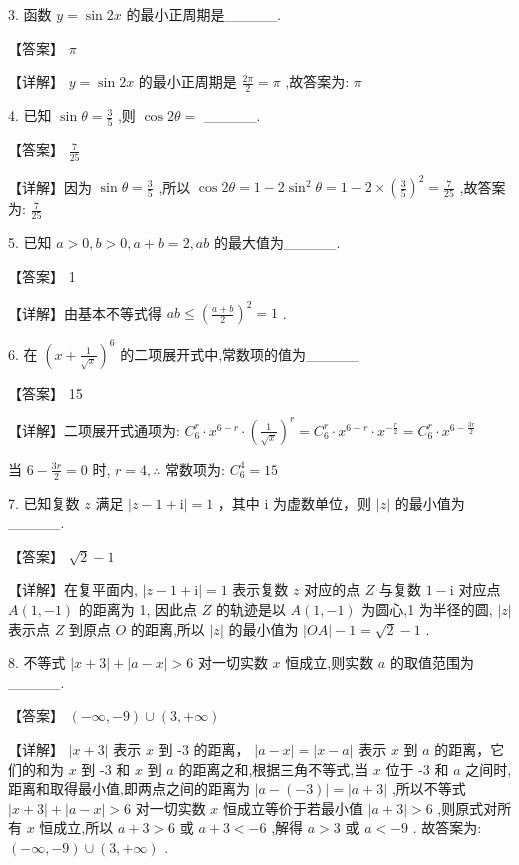 \documentclass[10pt]{article}
\begin{document}
3. 函数 \(y = \sin {2x}\) 的最小正周期是\_\_\_\_\_.

【答案】 \(\pi\)

【详解】 \(y = \sin {2x}\) 的最小正周期是 \(\frac{2\pi }{2} = \pi\) ,故答案为: \(\pi\)

4. 已知 \(\sin \theta  = \frac{3}{5}\) ,则 \(\cos {2\theta } =\) \_\_\_\_\_.

【答案】 \(\frac{7}{25}\)

【详解】因为 \(\sin \theta  = \frac{3}{5}\) ,所以 \(\cos {2\theta } = 1 - 2{\sin }^{2}\theta  = 1 - 2 \times  {\left( \frac{3}{5}\right) }^{2} = \frac{7}{25}\) ,故答案为: \(\frac{7}{25}\)

5. 已知 \(a > 0,b > 0,a + b = 2,{ab}\) 的最大值为\_\_\_\_\_.

【答案】 1

【详解】由基本不等式得 \({ab} \leq  {\left( \frac{a + b}{2}\right) }^{2} = 1\) .

6. 在 \({\left( x + \frac{1}{\sqrt{x}}\right) }^{6}\) 的二项展开式中,常数项的值为\_\_\_\_\_

【答案】 15

【详解】二项展开式通项为: \({C}_{6}^{r} \cdot  {x}^{6 - r} \cdot  {\left( \frac{1}{\sqrt{x}}\right) }^{r} = {C}_{6}^{r} \cdot  {x}^{6 - r} \cdot  {x}^{-\frac{r}{2}} = {C}_{6}^{r} \cdot  {x}^{6 - \frac{3r}{2}}\)

当 \(6 - \frac{3r}{2} = 0\) 时, \(r = 4,\therefore\) 常数项为: \({C}_{6}^{4} = {15}\)

7. 已知复数 \(z\) 满足 \(\left| {z - 1 + \mathrm{i}}\right|  = 1\) ，其中 \(\mathrm{i}\) 为虚数单位，则 \(\left| z\right|\) 的最小值为\_\_\_\_\_.

【答案】 \(\sqrt{2} - 1\)

【详解】在复平面内, \(\left| {z - 1 + \mathrm{i}}\right|  = 1\) 表示复数 \(z\) 对应的点 \(Z\) 与复数 \(1 - \mathrm{i}\) 对应点 \(A\left( {1, - 1}\right)\) 的距离为 1, 因此点 \(Z\) 的轨迹是以 \(A\left( {1, - 1}\right)\) 为圆心,1 为半径的圆, \(\left| z\right|\) 表示点 \(Z\) 到原点 \(O\) 的距离,所以 \(\left| z\right|\) 的最小值为 \(\left| {OA}\right|  - 1 = \sqrt{2} - 1\) .

8. 不等式 \(\left| {x + 3}\right|  + \left| {a - x}\right|  > 6\) 对一切实数 \(x\) 恒成立,则实数 \(a\) 的取值范围为\_\_\_\_\_.

【答案】 \(\left( {-\infty , - 9}\right)  \cup  \left( {3, + \infty }\right)\)

【详解】 \(\left| {x + 3}\right|\) 表示 \(x\) 到 -3 的距离， \(\left| {a - x}\right|  = \left| {x - a}\right|\) 表示 \(x\) 到 \(a\) 的距离，它们的和为 \(x\) 到 -3 和 \(x\) 到 \(a\) 的距离之和,根据三角不等式,当 \(x\) 位于 -3 和 \(a\) 之间时,距离和取得最小值,即两点之间的距离为 \(\left| {a - \left( {-3}\right) }\right|  = \left| {a + 3}\right|\) ,所以不等式 \(\left| {x + 3}\right|  + \left| {a - x}\right|  > 6\) 对一切实数 \(x\) 恒成立等价于若最小值 \(\left| {a + 3}\right|  > 6\) ,则原式对所有 \(x\) 恒成立,所以 \(a + 3 > 6\) 或 \(a + 3 <  - 6\) ,解得 \(a > 3\) 或 \(a <  - 9\) . 故答案为: \(\left( {-\infty , - 9}\right)  \cup  \left( {3, + \infty }\right)\) .
\end{document}

